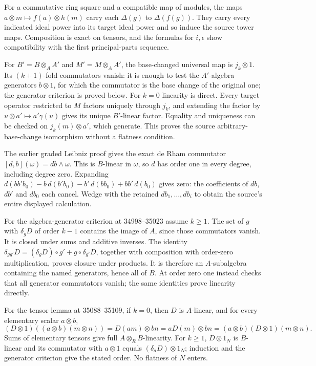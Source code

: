 For a commutative ring square and a compatible map of modules, the maps \(a\otimes m\mapsto f(a)\otimes h(m)\) carry each \(\Delta(g)\) to \(\Delta(f(g))\). They carry every indicated ideal power into its target ideal power and so induce the source tower maps. Composition is exact on tensors, and the formulas for \(i,\epsilon\) show compatibility with the first principal-parts sequence.

For \(B'=B\otimes_A A'\) and \(M'=M\otimes_A A'\), the base-changed universal map is \(j_k\otimes1\). Its \((k+1)\)-fold commutators vanish: it is enough to test the \(A'\)-algebra generators \(b\otimes1\), for which the commutator is the base change of the original one; the generator criterion is proved below. For \(k=0\) linearity is direct. Every target operator restricted to \(M\) factors uniquely through \(j_k\), and extending the factor by \(u\otimes a'\mapsto a'\gamma(u)\) gives its unique \(B'\)-linear factor. Equality and uniqueness can be checked on \(j_k(m)\otimes a'\), which generate. This proves the source arbitrary-base-change isomorphism without a flatness condition.

The earlier graded Leibniz proof gives the exact de Rham commutator \([d,b](\omega)=db\wedge\omega\). This is \(B\)-linear in \(\omega\), so \(d\) has order one in every degree, including degree zero. Expanding \(d(bb'b_0)-b\,d(b'b_0)-b'\,d(bb_0)+bb'\,d(b_0)\) gives zero: the coefficients of \(db\), \(db'\) and \(db_0\) each cancel. Wedge with the retained \(db_1,\ldots,db_i\) to obtain the source's entire displayed calculation.

For the algebra-generator criterion at 34998--35023 assume \(k\ge1\). The set of \(g\) with \(\delta_gD\) of order \(k-1\) contains the image of \(A\), since those commutators vanish. It is closed under sums and additive inverses. The identity \(\delta_{gg'}D=(\delta_gD)\circ g'+g\circ\delta_{g'}D\), together with composition with order-zero multiplication, proves closure under products. It is therefore an \(A\)-subalgebra containing the named generators, hence all of \(B\). At order zero one instead checks that all generator commutators vanish; the same identities prove linearity directly.

For the tensor lemma at 35088--35109, if \(k=0\), then \(D\) is \(A\)-linear, and for every elementary scalar \(a\otimes b\), \[
(D\otimes1)((a\otimes b)(m\otimes n))=D(am)\otimes bn
=aD(m)\otimes bn=(a\otimes b)(D\otimes1)(m\otimes n).
\] Sums of elementary tensors give full \(A\otimes_RB\)-linearity. For \(k\ge1\), \(D\otimes1_N\) is \(B\)-linear and its commutator with \(a\otimes1\) equals \((\delta_aD)\otimes1_N\); induction and the generator criterion give the stated order. No flatness of \(N\) enters.

